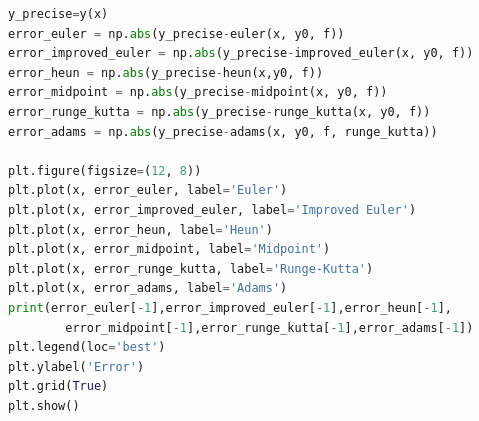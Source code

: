 \documentclass[a4paper,11pt,notitlepage]{article}
\begin{document}
\begin{lstlisting}[language=Python,caption={Tenth Chapter.py},label={code1}]
y_precise=y(x)
error_euler = np.abs(y_precise-euler(x, y0, f))
error_improved_euler = np.abs(y_precise-improved_euler(x, y0, f))
error_heun = np.abs(y_precise-heun(x,y0, f))
error_midpoint = np.abs(y_precise-midpoint(x, y0, f))
error_runge_kutta = np.abs(y_precise-runge_kutta(x, y0, f))
error_adams = np.abs(y_precise-adams(x, y0, f, runge_kutta))

plt.figure(figsize=(12, 8))
plt.plot(x, error_euler, label='Euler')
plt.plot(x, error_improved_euler, label='Improved Euler')
plt.plot(x, error_heun, label='Heun')
plt.plot(x, error_midpoint, label='Midpoint')
plt.plot(x, error_runge_kutta, label='Runge-Kutta')
plt.plot(x, error_adams, label='Adams')
print(error_euler[-1],error_improved_euler[-1],error_heun[-1],
        error_midpoint[-1],error_runge_kutta[-1],error_adams[-1])
plt.legend(loc='best')
plt.ylabel('Error')
plt.grid(True)
plt.show()       
\end{lstlisting}
\end{document}
